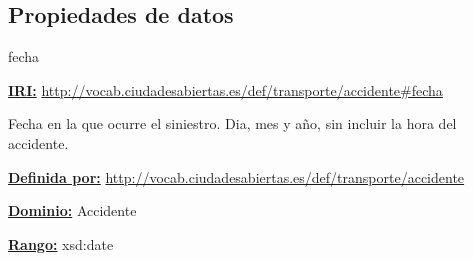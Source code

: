 \subsection{Propiedades de datos}



\begin{mybox}{fecha}
\begin{flushleft}
\underline{\textbf{IRI:}}
\url{http://vocab.ciudadesabiertas.es/def/transporte/accidente#fecha}
\newline

Fecha en la que ocurre el siniestro. Dia, mes y año, sin incluir la hora del accidente.
\newline

\underline{\textbf{Definida por:}}\newline
\url{http://vocab.ciudadesabiertas.es/def/transporte/accidente}
\newline

\underline{\textbf{Dominio:}} Accidente
\newline

\underline{\textbf{Rango:}}  xsd:date
\newline

\end{flushleft}
\end{mybox}



